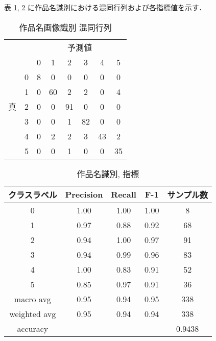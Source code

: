 \documentclass[onecolumn]{ujarticle}   %
\begin{document}
  表 \ref{tab:confusion_matrix_comic}, \ref{tab:exp_title_measure} に作品名識別における混同行列および各指標値を示す．

	\begin{table}[h]
    \begin{center}
      \caption{作品名画像識別 混同行列}
      \label{tab:confusion_matrix_comic}
      \begin{tabular}{|c|c||c|c|c|c|c|c|}\hline
        \multicolumn{2}{|c||}{}&\multicolumn{6}{|c|}{予測値} \\ \cline{3-8}
        \multicolumn{2}{|c||}{}&0&1&2&3&4&5 \\ \hline \hline
        \multirow{5}{*}{真}&0 &8&0&0&0&0&0\\ \cline{2-8}
        \multirow{5}{*}{値}&1 &0&60&2&2&0&4\\ \cline{2-8}
                          &2 &0&0&91&0&0&0\\ \cline{2-8}
                          &3 &0&0&1&82&0&0\\ \cline{2-8}
                          &4 &0&2&2&3&43&2\\ \cline{2-8}
                          &5 &0&0&1&0&0&35\\ \hline
      \end{tabular}
    \end{center}
  \end{table}

  \begin{table}[h]
  	\centering
  	\caption{作品名識別, 指標}
  	\vspace{-3mm}
  	\label{tab:exp_title_measure}
  	\begin{tabular}{|c|c|c|c|c|} \hline
  		クラスラベル&Precision&Recall&F-1&サンプル数\\ \hline\hline
  		0&1.00&1.00&1.00&8\\ \hline
  		1&0.97&0.88&0.92&68\\ \hline
  		2&0.94&1.00&0.97&91\\ \hline
  		3&0.94&0.99&0.96&83\\ \hline
  		4&1.00&0.83&0.91&52\\ \hline
      5&0.85&0.97&0.91&36\\ \hline
  		macro avg&0.95&0.94&0.95&338\\ \hline
  		weighted avg&0.95&0.94&0.94&338\\ \hline
  		accuracy&&&&0.9438\\ \hline
  	\end{tabular}
  \end{table}
\end{document}
